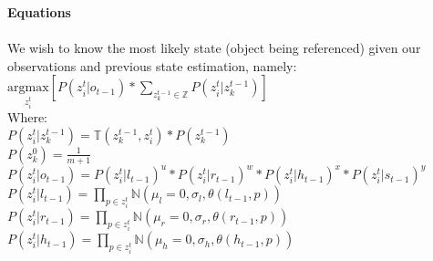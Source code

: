 \documentclass[12pt,letterpaper]{article}
\begin{document}
\textbf{Equations}\\\\
We wish to know the most likely state (object being referenced) given our observations and previous state estimation, namely:\\
$\underset{z^t_i}{\text{argmax}}[P(z^t_i | o_{t-1})*\displaystyle\sum_{z^{t-1}_k \in \mathbb{Z}} P(z^t_i|z^{t-1}_k)] $\\
Where:\\
$P(z^t_i | z^{t-1}_k) = \mathbb{T}(z^{t-1}_k, z^t_i)*P(z^{t-1}_k)$\\
$P(z^0_k) = \frac{1}{m+1}$\\
$P(z^t_i|o_{t-1}) = P(z^t_i|l_{t-1})^u*P(z^t_i|r_{t-1})^w*P(z^t_i|h_{t-1})^x*P(z^t_i|s_{t-1})^y$\\
$P(z^t_i|l_{t-1}) = \displaystyle \prod_{p \in z^t_i} \mathbb{N}(\mu_l=0, \sigma_l, \theta(l_{t-1}, p))$\\
$P(z^t_i|r_{t-1})=\displaystyle \prod_{p \in z^t_i} \mathbb{N}(\mu_r=0, \sigma_r, \theta(r_{t-1}, p))$\\
$P(z^t_i|h_{t-1}) =\displaystyle \prod_{p \in z^t_i} \mathbb{N}(\mu_h=0, \sigma_h, \theta(h_{t-1}, p))$\\
\end{document}
